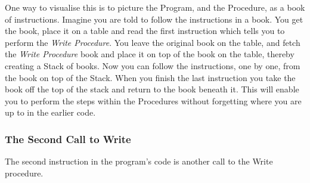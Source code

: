 
One way to visualise this is to picture the Program, and the Procedure, as a book of instructions. Imagine you are told to follow the instructions in a book. You get the book, place it on a table and read the first instruction which tells you to perform the \emph{Write Procedure}. You leave the original book on the table, and fetch the \emph{Write Procedure} book and place it on top of the book on the table, thereby creating a Stack of books. Now you can follow the instructions, one by one, from the book on top of the Stack. When you finish the last instruction you take the book off the top of the stack and return to the book beneath it. This will enable you to perform the steps within the Procedures without forgetting where you are up to in the earlier code.


\clearpage
\subsubsection{The Second Call to Write} %
\label{ssub:the_second_call_to_write}

The second instruction in the program's code is another call to the Write procedure.

